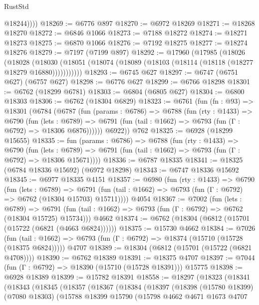 \begin{lexlean}{RustStd}
\begin{coremodule}
            @18244))))
@18269 := @6776 @897
@18270 := @6972 @18269
@18271 := @18268 @18270
@18272 := @6846 @1066
@18273 := @7188 @18272
@18274 := @18271 @18273
@18275 := @6870 @1066
@18276 := @7192 @18275
@18277 := @18274 @18276
@18279 := @7197 (@7199 @897)
@18292 := @17960
    (@17985
      (@18026
        (@18028
          (@18030 (@18051 (@18074 (@18089 (@18103 (@18114 (@18118 (@18277 @18279 @16880)))))))))))
@18293 := @6745 @627
@18297 := @6747 (@6751 @627) (@6757 @627)
@18298 := @6776 @627
@18299 := @6766 @18298
@18301 := @6762 (@18299 @6781)
@18303 := @6804 (@6805 @627)
@18304 := @6800 @18303
@18306 := @6762 (@18304 @6829)
@18323 := @6761
    (fun (fn : @93) =>
    @18301
      (@6784
        (@6787
          (fun (params : @6786) =>
          @6788
            (fun (rty : @1433) =>
            @6790
              (fun (lets : @6789) =>
              @6791 (fun (tail : @1662) => @6793 (fun (Γ : @6792) => @18306 @6876))))))
        @6922))
    @762
@18325 := @6928 (@18299 @15655)
@18335 := fun (params : @6786) =>
  @6788
    (fun (rty : @1433) =>
    @6790
      (fun (lets : @6789) =>
      @6791 (fun (tail : @1662) => @6793 (fun (Γ : @6792) => @18306 @15671))))
@18336 := @6787 @18335
@18341 := @18325 (@6784 @18336 @15692) (@6972 @18298)
@18343 := @6747 @18336 @15692
@18345 := @6977 @18335 @4151
@18357 := @6980
    (fun (rty : @1433) =>
    @6790
      (fun (lets : @6789) =>
      @6791 (fun (tail : @1662) => @6793 (fun (Γ : @6792) => @6762 (@18304 @15703) @15711))))
    @4054
@18367 := @7002
    (fun (lets : @6789) =>
    @6791 (fun (tail : @1662) => @6793 (fun (Γ : @6792) => @6762 (@18304 @15725) @15734)))
    @4662
@18374 := @6762 (@18304 (@6812 (@15701 (@15722 (@6821 (@4663 @6824))))))
@18375 := @15730 @4662
@18384 := @7026
    (fun (tail : @1662) => @6793 (fun (Γ : @6792) => @18374 (@15710 (@15728 (@18375 @6824)))))
    @4707
@18389 := @18304 (@6812 (@15701 (@15722 (@6821 @4708))))
@18390 := @6762 @18389
@18391 := @18375 @4707
@18397 := @7044 (fun (Γ : @6792) => @18390 (@15710 (@15728 @18391))) @15775
@18398 := @6928 @18389
@18399 := @15782 @18391
@18558 := @18297
    (@18323
      (@18341
        (@18343
          (@18345
            (@18357
              (@18367
                (@18384
                  (@18397
                    (@18398
                      (@15780 @18399)
                      (@7080 @18303)
                      (@15788
                        @18399
                        @15790
                        (@15798
                          @4662
                          @4671
                          @1673
                          @4707

\end{coremodule}
\end{lexlean}
